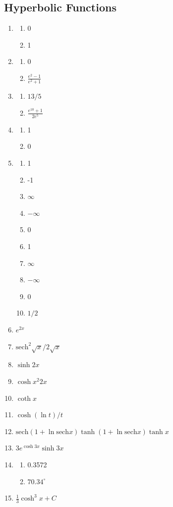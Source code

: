\documentclass{article} \usepackage[margin=1in]{geometry}
\newcommand{\sech}{\mathrm{sech}}
\begin{document}
\subsection{Hyperbolic Functions}
\begin{enumerate}
	\item \begin{enumerate}
		      \item 0
		      \item 1
	      \end{enumerate}
	\item \begin{enumerate}
		      \item 0
		      \item $\frac{e^2-1}{e^2+1}$
	      \end{enumerate}
	\item \begin{enumerate}
		      \item $13/5$
		      \item $\frac{e^{10}+1}{2e^5}$
	      \end{enumerate}
	      \setcounter{enumi}{4}
	\item \begin{enumerate}
		      \item 1
		      \item 0
	      \end{enumerate}
	      \setcounter{enumi}{22}
	\item \begin{enumerate}
		      \item 1
		      \item -1
		      \item $\infty$
		      \item $-\infty$
		      \item 0
		      \item 1
		      \item $\infty$
		      \item $-\infty$
		      \item 0
		      \item $1/2$
	      \end{enumerate}
	      \setcounter{enumi}{29}
	\item $e^{2x}$
	\item $\mathrm{sech}^2{\sqrt x}/2\sqrt x$
	\item $\sinh{2x}$
	\item $\cosh{x^2}2x$
	\item $\coth{x}$
	\item $\cosh(\ln t)/t$
	\item $\mathrm{sech}(1+\ln\sech x)\tanh(1+\ln\sech x)\tanh x$
	\item $3e^{\cosh{3x}}\sinh{3x}$
	      \setcounter{enumi}{50}
	\item \begin{enumerate}
		      \item 0.3572
		      \item $70.34^\circ$
	      \end{enumerate}
	      \setcounter{enumi}{58}
	\item $\frac{1}{3}\cosh^3x+C$
\end{enumerate}
\end{document}

